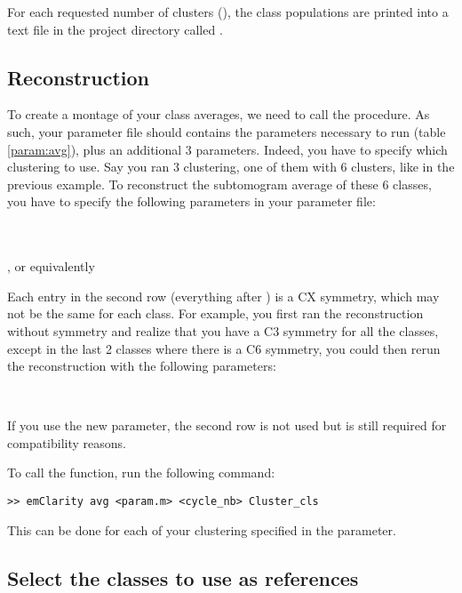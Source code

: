 For each requested number of clusters (), the class populations are printed into a text file in the
project directory called .


\subsection{Reconstruction}

To create a montage of your class averages, we need to call the  procedure. As such, your parameter file should contains the parameters necessary to run  (table \ref{param:avg}), plus an additional 3 parameters. Indeed, you have to specify which clustering to use. Say you ran 3 clustering, one of them with 6 clusters, like in the previous example. To reconstruct the subtomogram average of these 6 classes, you have to specify the following parameters in your parameter file:

\\
\\
, or equivalently\\

Each entry in the second row (everything after ) is a CX symmetry, which may not be the same for each class. For example, you first ran the reconstruction without symmetry and realize that you have a C3 symmetry for all the classes, except in the last 2 classes where there is a C6 symmetry, you could then rerun the reconstruction with the following parameters:

\\

\begin{note}If you use the new  parameter, the second row is not used but is still required for compatibility reasons.\end{note}

To call the  function, run the following command:
\begin{lstlisting}
>> emClarity avg <param.m> <cycle_nb> Cluster_cls
\end{lstlisting}
This can be done for each of your clustering specified in the  parameter.


\subsection{Select the classes to use as references}

